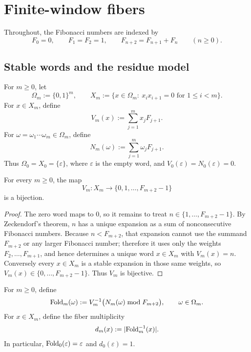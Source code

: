 \section{Finite-window fibers}\label{sec:preliminaries}

Throughout, the Fibonacci numbers are indexed by
\[
  F_0=0,
  \qquad
  F_1=F_2=1,
  \qquad
  F_{n+2}=F_{n+1}+F_n
  \qquad (n\ge 0).
\]

\subsection{Stable words and the residue model}

\begin{definition}
\label{def:stable-words}
For \(m\ge 0\), let
\[
  \Omega_m:=\{0,1\}^m,
  \qquad
  X_m:=\{x\in\Omega_m:\ x_ix_{i+1}=0\text{ for }1\le i<m\}.
\]
For \(x\in X_m\), define
\[
  V_m(x):=\sum_{j=1}^m x_jF_{j+1}.
\]
For \(\omega=\omega_1\cdots \omega_m\in\Omega_m\), define
\[
  N_m(\omega):=\sum_{j=1}^m \omega_jF_{j+1}.
\]
Thus \(\Omega_0=X_0=\{\varepsilon\}\), where \(\varepsilon\) is the empty word,
and \(V_0(\varepsilon)=N_0(\varepsilon)=0\).
\end{definition}

\begin{proposition}
\label{prop:Vm-bijection}
For every \(m\ge 0\), the map
\[
  V_m\colon X_m\longrightarrow \{0,1,\dots,F_{m+2}-1\}
\]
is a bijection.
\end{proposition}

\begin{proof}
The zero word maps to \(0\), so it remains to treat
\(n\in\{1,\dots,F_{m+2}-1\}\).  By Zeckendorf's theorem, \(n\) has a unique
expansion as a sum of nonconsecutive Fibonacci numbers.  Because
\(n<F_{m+2}\), that expansion cannot use the summand \(F_{m+2}\) or any larger
Fibonacci number; therefore it uses only the weights \(F_2,\dots,F_{m+1}\),
and hence determines a unique word \(x\in X_m\) with \(V_m(x)=n\).
Conversely every \(x\in X_m\) is a stable expansion in those same weights, so
\(V_m(x)\in\{0,\dots,F_{m+2}-1\}\).  Thus \(V_m\) is bijective.
\end{proof}

\begin{definition}
\label{def:fold-map}
For \(m\ge 0\), define
\[
  \mathrm{Fold}_m(\omega):=
  V_m^{-1}\bigl(N_m(\omega)\bmod F_{m+2}\bigr),
  \qquad \omega\in\Omega_m.
\]
For \(x\in X_m\), define the fiber multiplicity
\[
  d_m(x):=\lvert \mathrm{Fold}_m^{-1}(x) \rvert.
\]
In particular, \(\mathrm{Fold}_0(\varepsilon)=\varepsilon\) and
\(d_0(\varepsilon)=1\).
\end{definition}

